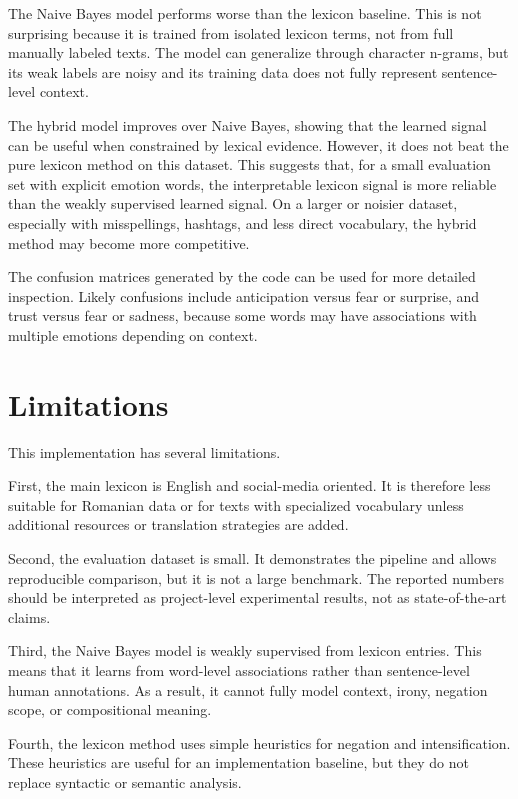 \documentclass[11pt]{article}
\begin{document}
The Naive Bayes model performs worse than the lexicon baseline. This is not surprising because it is trained from isolated lexicon terms, not from full manually labeled texts. The model can generalize through character n-grams, but its weak labels are noisy and its training data does not fully represent sentence-level context.

The hybrid model improves over Naive Bayes, showing that the learned signal can be useful when constrained by lexical evidence. However, it does not beat the pure lexicon method on this dataset. This suggests that, for a small evaluation set with explicit emotion words, the interpretable lexicon signal is more reliable than the weakly supervised learned signal. On a larger or noisier dataset, especially with misspellings, hashtags, and less direct vocabulary, the hybrid method may become more competitive.

The confusion matrices generated by the code can be used for more detailed inspection. Likely confusions include anticipation versus fear or surprise, and trust versus fear or sadness, because some words may have associations with multiple emotions depending on context.

\section{Limitations}

This implementation has several limitations.

First, the main lexicon is English and social-media oriented. It is therefore less suitable for Romanian data or for texts with specialized vocabulary unless additional resources or translation strategies are added.

Second, the evaluation dataset is small. It demonstrates the pipeline and allows reproducible comparison, but it is not a large benchmark. The reported numbers should be interpreted as project-level experimental results, not as state-of-the-art claims.

Third, the Naive Bayes model is weakly supervised from lexicon entries. This means that it learns from word-level associations rather than sentence-level human annotations. As a result, it cannot fully model context, irony, negation scope, or compositional meaning.

Fourth, the lexicon method uses simple heuristics for negation and intensification. These heuristics are useful for an implementation baseline, but they do not replace syntactic or semantic analysis.
\end{document}
